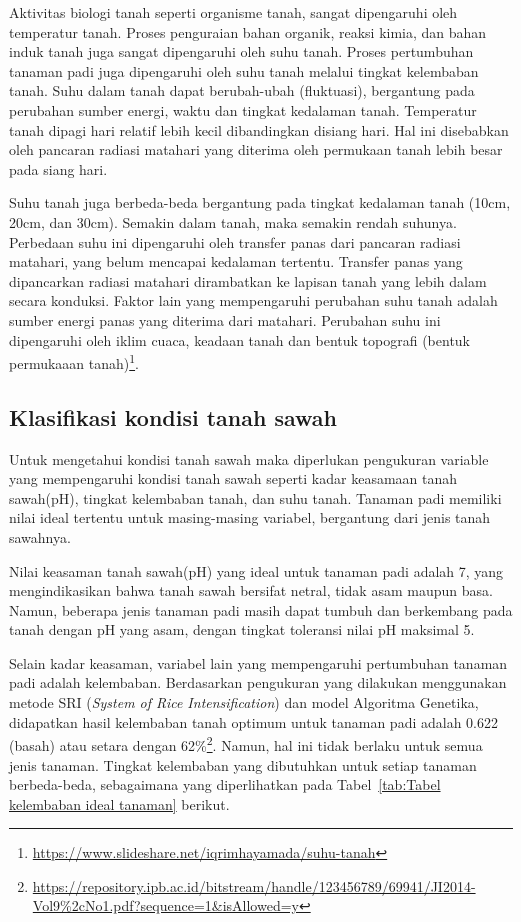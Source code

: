 \begin{enumerate}
    Aktivitas biologi tanah seperti organisme tanah, sangat dipengaruhi oleh temperatur tanah. Proses penguraian bahan organik, reaksi kimia, dan bahan induk tanah juga sangat dipengaruhi oleh suhu tanah. Proses pertumbuhan tanaman padi juga dipengaruhi oleh suhu tanah melalui tingkat kelembaban tanah. Suhu dalam tanah dapat berubah-ubah (fluktuasi), bergantung pada perubahan sumber energi, waktu dan tingkat kedalaman tanah. Temperatur tanah dipagi hari relatif lebih kecil dibandingkan disiang hari. Hal ini disebabkan oleh pancaran radiasi matahari yang diterima oleh permukaan tanah lebih besar pada siang hari. 
    
    Suhu tanah juga berbeda-beda bergantung pada tingkat kedalaman tanah (10cm, 20cm, dan 30cm). Semakin dalam tanah, maka semakin rendah suhunya. Perbedaan suhu ini dipengaruhi oleh transfer panas dari pancaran radiasi matahari, yang belum mencapai kedalaman tertentu. Transfer panas yang dipancarkan radiasi matahari dirambatkan ke lapisan tanah yang lebih dalam secara konduksi. Faktor lain yang mempengaruhi perubahan suhu tanah adalah sumber energi panas yang diterima dari matahari. Perubahan suhu ini dipengaruhi oleh iklim cuaca, keadaan tanah dan bentuk topografi (bentuk permukaaan tanah)\footnote{\url{https://www.slideshare.net/iqrimhayamada/suhu-tanah}}.

\end{enumerate}



\subsection{Klasifikasi kondisi tanah sawah}
\label{sec:template}
Untuk mengetahui kondisi tanah sawah maka diperlukan pengukuran variable yang mempengaruhi kondisi tanah sawah seperti kadar keasamaan tanah sawah(pH), tingkat kelembaban tanah, dan suhu tanah. Tanaman padi memiliki nilai ideal tertentu untuk masing-masing variabel, bergantung dari jenis tanah sawahnya. 

Nilai keasaman tanah sawah(pH) yang ideal untuk tanaman padi adalah 7, yang mengindikasikan bahwa tanah sawah bersifat netral, tidak asam maupun basa. Namun, beberapa jenis tanaman padi masih dapat tumbuh dan berkembang pada tanah dengan pH yang asam, dengan tingkat toleransi nilai pH maksimal 5. 

Selain kadar keasaman, variabel lain yang mempengaruhi pertumbuhan tanaman padi adalah kelembaban. Berdasarkan pengukuran yang dilakukan menggunakan metode SRI  (\textit{System of Rice Intensification}) dan model Algoritma Genetika, didapatkan hasil kelembaban tanah optimum untuk tanaman padi adalah 0.622 (basah) atau setara dengan 62\%\footnote{\url{https://repository.ipb.ac.id/bitstream/handle/123456789/69941/JI2014-Vol9\%2cNo1.pdf?sequence=1&isAllowed=y}}. Namun, hal ini tidak berlaku untuk semua jenis tanaman. Tingkat kelembaban yang dibutuhkan untuk setiap tanaman berbeda-beda, sebagaimana yang diperlihatkan pada Tabel~\ref{tab:Tabel kelembaban ideal tanaman} berikut.


